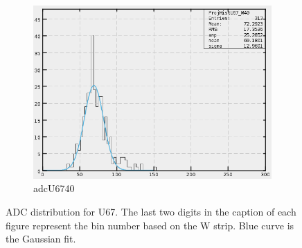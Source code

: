 \begin{figure}[h]
\begin{subfigure}[h]{0.3\textwidth}
        \includegraphics[width=\textwidth, keepaspectratio = true]{adcU67_40}
        \caption{adcU6740}
        \label{fig:adcU67_40}
    \end{subfigure}
    \caption{ADC distribution for U67. The last two digits in the caption of each figure represent the bin number based on the W strip.
    Blue curve is the Gaussian fit.}
    \label{fig:adcU3}
\end{figure}

